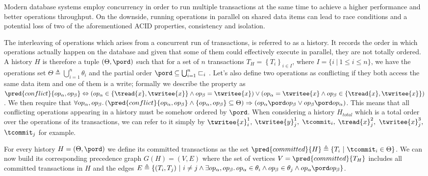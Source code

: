 Modern database systems employ concurrency in order to run multiple transactions at the same time to achieve a higher performance and better operations throughput. On the downside, running operations in parallel on shared data items can lead to race conditions and a potential loss of two of the aforementioned ACID properties, consistency and isolation.

The interleaving of operations which arises from a concurrent run of transactions, is referred to as a history. It records the order in which operations actually happen on the database and given that some of them could effectively execute in parallel, they are not totally ordered. A history $H$ is therefore a tuple $(\Theta, \pord)$ such that for a set of $n$ transactions $T_H = \left\lbrace T_i \right\rbrace_{i \in I}$, where $I = \{ i\ |\ 1 \leq i \leq n\}$, we have the operations set $\Theta \triangleq \bigcup_{i = 1}^{n} \theta_i$ and the partial order $\pord \subseteq \bigcup_{i = 1}^{n} \sqsubset_i$ \cite{ccontrol}. Let's also define two operations as conflicting if they both access the same data item and one of them is a write; formally we describe the property as $\pred{conflict}{op_\alpha, op_\beta} \Leftrightarrow \left( op_\alpha \in \{ \tread{x}, \twritee{x} \} \land op_\beta = \twritee{x} \right) \lor \left( op_\alpha = \twritee{x} \land op_\beta \in \{ \tread{x}, \twritee{x} \} \right)$. We then require that $\forall op_\alpha, op_\beta \ldotp (\pred{conflict}{op_\alpha, op_\beta} \land\left\lbrace op_\alpha, op_\beta \right\rbrace \subseteq \Theta) \Rightarrow (op_\alpha \pord op_\beta \lor op_\beta \pord op_\alpha)$. This means that all conflicting operations appearing in a history must be somehow ordered by $\pord$. When considering a history $H_{total}$ which is a total order over the operations of its transactions, we can refer to it simply by $\twritee{x}_i^1, $ $\twritee{y}_j^1, $ $\tcommit_i, $ $\tread{x}_j^2, $ $\twritee{x}_j^3, $ $\tcommit_j$ for example.

For every history $H = (\Theta, \pord)$ we define its committed transactions as the set $\pred{committed}{H} \triangleq \{ T_i\ |\ \tcommit_i \in \Theta \}$. We can now build its corresponding precedence graph \cite{dbconcepts} $G(H) = (V, E)$ where the set of vertices $V = \pred{committed}{T_H}$ includes all committed transactions in $H$ and the edges $E \triangleq \{ (T_i, T_j)\ |\ i \neq j \land \exists op_\alpha, op_\beta \ldotp op_\alpha \in \theta_i \land op_\beta \in \theta_j \land op_\alpha \pord op_\beta \}$.

